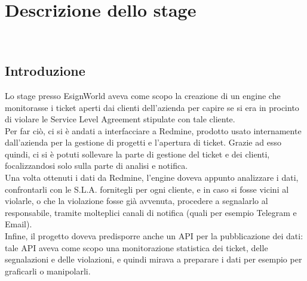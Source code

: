 
\chapter{Descrizione dello stage}
\label{cap:descrizione-stage}

\\

\section{Introduzione}
Lo stage presso EsignWorld aveva come scopo la creazione di un engine che monitorasse i ticket aperti dai clienti dell'azienda per capire se si era in procinto di violare le Service Level Agreement stipulate con tale cliente. \\
Per far ciò, ci si è andati a interfacciare a Redmine, prodotto usato internamente dall'azienda per la gestione di progetti e l'apertura di ticket. Grazie ad esso quindi, ci si è potuti sollevare la parte di gestione del ticket e dei clienti, focalizzandosi solo sulla parte di analisi e notifica. \\
Una volta ottenuti i dati da Redmine, l'engine doveva appunto analizzare i dati, confrontarli con le S.L.A. fornitegli per ogni cliente, e in caso si fosse vicini al violarle, o che la violazione fosse già avvenuta, procedere a segnalarlo al responsabile, tramite molteplici canali di notifica (quali per esempio Telegram e Email). \\
Infine, il progetto doveva predisporre anche un API per la pubblicazione dei dati: tale API aveva come scopo una monitorazione statistica dei ticket, delle segnalazioni e delle violazioni, e quindi mirava a preparare i dati per esempio per graficarli o manipolarli.


